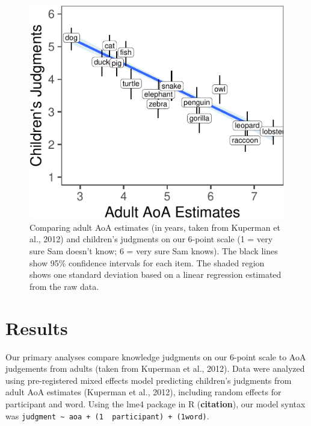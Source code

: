 \documentclass[10pt, letterpaper]{article}
\newenvironment{CodeChunk}{}{}
\begin{document}
\begin{CodeChunk}
\begin{figure}[tb]
\includegraphics{figs/overall-1} \caption[Comparing adult AoA estimates (in years, taken from Kuperman et al., 2012) and children’s judgments on our 6-point scale (1 = very sure Sam doesn’t know]{Comparing adult AoA estimates (in years, taken from Kuperman et al., 2012) and children’s judgments on our 6-point scale (1 = very sure Sam doesn’t know; 6 = very sure Sam knows). The black lines show 95\% confidence intervals for each item. The shaded region shows one standard deviation based on a linear regression estimated from the raw data.}\label{fig:overall}
\end{figure}
\end{CodeChunk}

\hypertarget{results}{%
\section{Results}\label{results}}

Our primary analyses compare knowledge judgments on our 6-point scale to
AoA judgements from adults (taken from Kuperman et al., 2012). Data were
analyzed using pre-registered mixed effects model predicting children's
judgments from adult AoA estimates (Kuperman et al., 2012), including
random effects for participant and word. Using the lme4 package in R
(\textbf{citation}), our model syntax was
\texttt{judgment\ \textasciitilde{}\ aoa\ +\ (1\ \textbar{}\ participant)\ +\ (1\textbar{}word)}.
\end{document}
